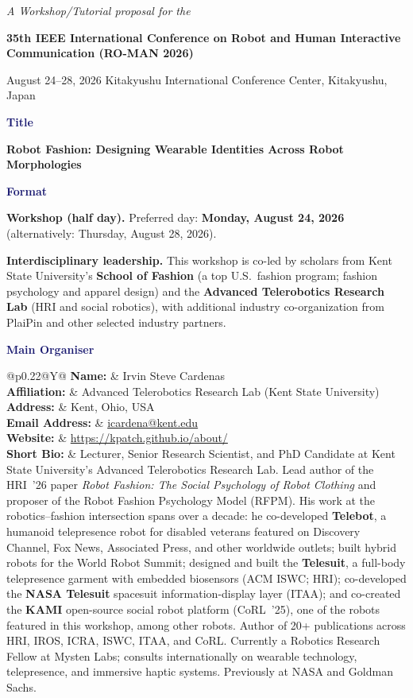 \documentclass[12pt,letterpaper]{article}
\makeatletter
\newcommand{\FormField}[2]{\textbf{#1} & #2\\}
\newcommand{\FormSection}[1]{\par\vspace{0.75\baselineskip}\noindent{\color{MidnightBlue}\rule{\textwidth}{0.4pt}}\par\vspace{2pt}\noindent\textbf{\textcolor{MidnightBlue}{#1}}\par}
\newcommand{\FormBlockSep}{\par\vspace{0.5\baselineskip}}
\newcommand{\OrganizerBlock}[7]{%
  \begingroup
  \renewcommand{\arraystretch}{1.15}%
  \begin{tabularx}{\textwidth}{@{}p{0.22\textwidth}@{\hspace{1em}}Y@{}}
    \FormField{Name:}{#1}
    \FormField{Affiliation:}{#2}
    \FormField{Address:}{#3}
    \FormField{Email Address:}{#5}
    \FormField{Website:}{#6}
    \FormField{Short Bio:}{#7}
  \end{tabularx}
  \endgroup
}
\makeatother
\begin{document}
\begin{center}
  {\fontsize{12}{14}\selectfont\itshape A Workshop/Tutorial proposal for the\par}
  \vspace{0.4em}
  {\fontsize{18}{22}\selectfont\bfseries 35th IEEE International Conference on Robot and Human Interactive Communication (RO-MAN 2026)\par}
  \vspace{0.6em}
  {\fontsize{11}{13}\selectfont August 24--28, 2026 \enspace\textbullet\enspace Kitakyushu International Conference Center, Kitakyushu, Japan\par}
\end{center}
\vspace{0.5em}
\noindent{\color{MidnightBlue}\rule{\textwidth}{0.8pt}}
\vspace{2pt}

\noindent\textbf{\textcolor{MidnightBlue}{Title}}\par
{\fontsize{14}{17}\selectfont\textbf{Robot Fashion: Designing Wearable Identities Across Robot Morphologies}}

\FormSection{Format}
\textbf{Workshop (half day).} Preferred day: \textbf{Monday, August 24, 2026} (alternatively: Thursday, August 28, 2026).

\FormBlockSep
\textbf{Interdisciplinary leadership.} This workshop is co-led by scholars from Kent State University's \textbf{School of Fashion} (a top U.S.\ fashion program; fashion psychology and apparel design) and the \textbf{Advanced Telerobotics Research Lab} (HRI and social robotics), with additional industry co-organization from PlaiPin and other selected industry partners.

\FormSection{Main Organiser}
\OrganizerBlock
  {Irvin Steve Cardenas}
  {Advanced Telerobotics Research Lab (Kent State University)}
  {Kent, Ohio, USA}
  {+1 330-208-9303}
  {\href{mailto:icardena@kent.edu}{icardena@kent.edu}}
  {\url{https://kpatch.github.io/about/}}
  {Lecturer, Senior Research Scientist, and PhD Candidate at Kent State University's Advanced Telerobotics Research Lab. Lead author of the HRI~'26 paper \textit{Robot Fashion: The Social Psychology of Robot Clothing} and proposer of the Robot Fashion Psychology Model (RFPM). His work at the robotics--fashion intersection spans over a decade: he co-developed \textbf{Telebot}, a humanoid telepresence robot for disabled veterans featured on Discovery Channel, Fox News, Associated Press, and other worldwide outlets; built hybrid robots for the World Robot Summit; designed and built the \textbf{Telesuit}, a full-body telepresence garment with embedded biosensors (ACM ISWC; HRI); co-developed the \textbf{NASA Telesuit} spacesuit information-display layer (ITAA); and co-created the \textbf{KAMI} open-source social robot platform (CoRL~'25), one of the robots featured in this workshop, among other robots. Author of 20+ publications across HRI, IROS, ICRA, ISWC, ITAA, and CoRL. Currently a Robotics Research Fellow at Mysten Labs; consults internationally on wearable technology, telepresence, and immersive haptic systems. Previously at NASA and Goldman Sachs.}
\end{document}
